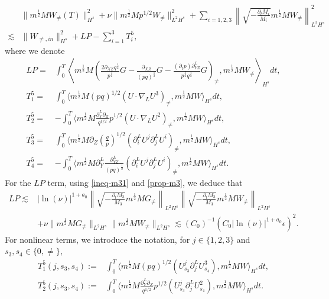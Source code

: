 \documentclass[12pt]{article}
\numberwithin{equation}{section}
\begin{document}
    \begin{align*}
		&\|m^{\frac{1}{2}}MW_{\neq}(T)\|^2_{H^s}+ \nu \|m^{\frac{1}{2}}M p^{1/2} W_{\neq}\|^2_{L^2H^s}+\sum_{i=1,2,3}\left \|\sqrt{-\frac{\partial_t M_i}{M_i}}m^{\frac{1}{2}}M W_{\neq}\right\|^2_{L^2H^s} \\
		\lesssim& \|W_{\neq,in}\|^2_{H^s}+LP- \sum_{i=1}^{3}T^5_i,
	\end{align*}
	where we denote
	\begin{align*}
    LP=&\int_{0}^{T}\left \langle m^{\frac{1}{2}}M\left(\frac{2\partial_{XZ}q^{\frac{1}{2}}}{p^{\frac{3}{2}}}G -\frac{\partial_{XZ}}{(pq)^{\frac{1}{2}}}G-\frac{(\partial_tp)\partial_{YZ}^L}{p^{\frac{3}{2}}q^{\frac{1}{2}}}G\right)_{\neq},m^{\frac{1}{2}}MW_{\neq}\right\rangle_{H^s}dt,\\
		T^5_1=&\int_{0}^{T}\langle m^{\frac{1}{2}}M(pq)^{1/2}(U\cdot\nabla_L U^3)_{\neq},m^{\frac{1}{2}}M W\rangle_{H^s} dt,\\
        T^5_2=&-\int_{0}^{T}\langle m^{\frac{1}{2}}M \frac{\partial_Y^L \partial_Z}{q^{1/2}} p^{1/2}(U\cdot\nabla_L U^2)_{\neq},m^{\frac{1}{2}}M W\rangle_{H^s} dt,\\
		T^5_3=&\int_{0}^{T}\langle m^{\frac{1}{2}}M\partial_Z (\frac{q}{p})^{1/2}(\partial^L_i U^j \partial^L_j U^i)_{\neq},m^{\frac{1}{2}}MW\rangle_{H^s} dt,\\
		T^5_4=&-\int_{0}^{T}\langle m^{\frac{1}{2}}M\partial_Y^L\frac{\partial_{YZ}^L}{(pq)^{\frac{1}{2}}}(\partial^L_i U^j \partial^L_j U^i)_{\neq},m^{\frac{1}{2}}MW\rangle_{H^s} dt.
	\end{align*}
    For the $LP$ term, using \eqref{ineq-m31} and \eqref{prop-m3}, we deduce that
  	\begin{align*}
  		LP\lesssim&|\ln(\nu)|^{1+a_0}
  		\left\|\sqrt{-\frac{\partial_tM_3}{M_3}}m^{\frac{1}{2}}MG_{\neq}\right\|_{L^2H^s}
  		 \left\|\sqrt{-\frac{\partial_tM_3}{M_3}}m^{\frac{1}{2}}MW_{\neq}\right\|_{L^2H^s}\\
         &+\nu\|m^{\frac{1}{2}}MG_{\neq}\|_{L^2H^s}\|m^{\frac{1}{2}}MW_{\neq}\|_{L^2H^s}
         \lesssim (C_0)^{-1}(C_0|\ln(\nu)|^{1+a_0}\epsilon)^2.
  	\end{align*}
	For nonlinear terms, we introduce the notation, for $j\in\{1,2,3\}$ and $s_3,s_4\in\{0,\neq \}$,
	\begin{align*}
		T^5_1(j,s_3,s_4):=&\int_{0}^{T}\langle m^{\frac{1}{2}}M(pq)^{1/2}(U^j_{s_3}\partial_j^L U^3_{s_4}),m^{\frac{1}{2}}M W\rangle_{H^s} dt, \\
        T^5_2(j,s_3,s_4):=&\int_{0}^{T}\langle m^{\frac{1}{2}}M \frac{\partial_Y^L \partial_Z}{q^{1/2}} p^{1/2} (U^j_{s_3}\partial_j^L U^2_{s_4}),m^{\frac{1}{2}}M W\rangle_{H^s} dt.
	\end{align*}
\end{document}
